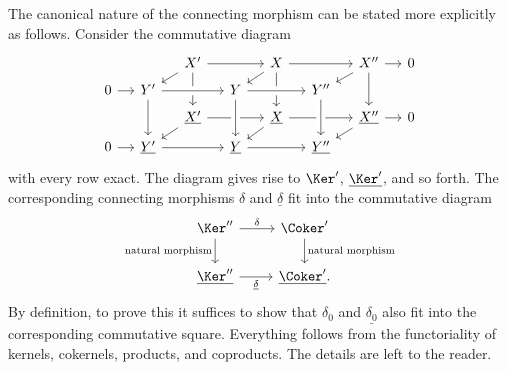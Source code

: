 \begin{remark}\label{rem:connecting-canonical}
	The canonical nature of the connecting morphism can be stated more
	explicitly as follows. Consider the commutative diagram
	\[\begin{tikzcd}[row sep=tiny, column sep=small]
		& & X' \arrow[rr] \arrow[ld] \arrow[dd] & & X \arrow[rr] \arrow[ld] \arrow[dd] & & X'' \arrow[r] \arrow[ld] \arrow[dd] & 0 \\
		0 \arrow[r] & Y' \arrow[rr, crossing over] & & Y \arrow[rr, crossing over] & & Y'' & & \\
		& & \underline{X'} \arrow[rr] \arrow[ld] & & \underline{X} \arrow[rr] \arrow[ld] & & \underline{X''} \arrow[ld] \arrow[r] & 0 \\
		0 \arrow[r] & \underline{Y'} \arrow[rr] \arrow[leftarrow, uu, crossing over] & & \underline{Y} \arrow[rr] \arrow[leftarrow, uu, crossing over] & & \underline{Y''} \arrow[leftarrow, uu, crossing over] & &
	\end{tikzcd}\]
	with every row exact. The diagram gives rise to $\Ker'$,
	$\underline{\Ker'}$, and so forth. The corresponding connecting morphisms
	$\delta$ and $\underline{\delta}$ fit into the commutative diagram
	\[\begin{tikzcd}
		\Ker'' \arrow[r, "\delta"] \arrow[d, "\text{natural morphism}"'] & \Coker' \arrow[d, "\text{natural morphism}"] \\
		\underline{\Ker''} \arrow[r, "\underline{\delta}"'] & \underline{\Coker'} .
	\end{tikzcd}\]
	By definition, to prove this it suffices to show that $\delta_0$ and
	$\underline{\delta_0}$ also fit into the corresponding commutative square.
	Everything follows from the functoriality of kernels, cokernels, products,
	and coproducts. The details are left to the reader.
\end{remark}

